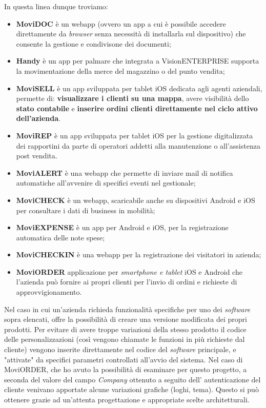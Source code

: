 In questa linea dunque troviamo:
\begin{itemize}
    \item \textbf{MoviDOC} è un \gls{webapp} (ovvero un app a cui è possibile accedere direttamente da \textit{browser} senza 
          necessità di installarla sul dispositivo) che consente la gestione e condivisone dei documenti;
    \item \textbf{Handy} è un app per palmare che integrata a VisionENTERPRISE supporta la movimentazione della merce del magazzino o del punto vendita;
    \item \textbf{MoviSELL} è un app sviluppata per tablet iOS dedicata agli agenti aziendali, permette di: \textbf{visualizzare i 
          clienti su una mappa}, avere visibilità dello \textbf{stato contabile} e \textbf{inserire ordini clienti direttamente nel 
          ciclo attivo dell'azienda}.
    \item \textbf{MoviREP} è un app sviluppata per tablet iOS per la gestione digitalizzata dei rapportini da parte di operatori addetti alla manutenzione o 
          all'assistenza post vendita. 
    \item \textbf{MoviALERT} è una \gls{webapp} che permette di inviare mail di notifica automatiche all'avvenire di 
          specifici eventi nel gestionale;
    \item \textbf{MoviCHECK} è un \gls{webapp}, scaricabile anche su dispositivi Android e iOS per 
          consultare i dati di business in mobilità;
    \item \textbf{MoviEXPENSE} è un app per Android e iOS, per la registrazione automatica delle note 
          spese;
    \item \textbf{MoviCHECKIN} è una \gls{webapp} per la registrazione dei visitatori in azienda;
    \item \textbf{MoviORDER} applicazione per \textit{smartphone e tablet} iOS e Android che l’azienda può fornire ai propri clienti per l’invio di ordini e 
          richieste di approvvigionamento.
\end{itemize}

Nel caso in cui un'azienda richieda funzionalità specifiche per uno dei \textit{software} sopra elencati, {\company} offre la possibilità di creare una versione 
modificata dei propri prodotti. Per evitare di avere troppe variazioni della stesso prodotto il codice delle personalizzazioni (così vengono chiamate le funzioni in 
più richieste dal cliente) vengono inserite direttamente nel codice del \textit{software} principale, e "attivate" da specifici parametri controllati all'avvio del 
sistema. Nel caso di MoviORDER, che ho avuto la possibilità di esaminare per questo progetto, a seconda del valore del campo \textit{Company} ottenuto a seguito dell'
autenticazione del cliente venivano apportate alcune variazioni grafiche (loghi, tema). Questo si può ottenere grazie ad un'attenta progettazione e appropriate scelte 
architetturali.

 
